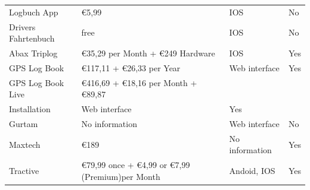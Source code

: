 \begin{tabular}{p{3cm}p{5cm}p{3cm}p{2cm}}
Logbuch App                & \euro 5,99                                                                                                  & IOS                   & No  \\ 
Drivers Fahrtenbuch        & free                                                                                                        & IOS                   & No  \\ 
Abax Triplog               & \euro 35,29 per Month + \euro 249 Hardware                                                                  & IOS                   & Yes \\ 
GPS Log Book               & \euro 117,11 + \euro 26,33 per Year                                                                         & Web interface         & Yes \\ 
GPS Log Book Live          & \euro 416,69 + \euro 18,16 per Month + \euro 89,87\\   Installation & Web interface         & Yes \\
Gurtam                     & No information                                                                                              & Web interface         & No  \\ 
Maxtech                    & \euro 189                                                                                                   & No information        & Yes \\ 
Tractive                   & \euro 79,99 once + \euro 4,99 or \euro 7,99 (Premium)per Month                                              & Andoid, IOS           & Yes \\ 
\bottomrule
\end{tabular}

